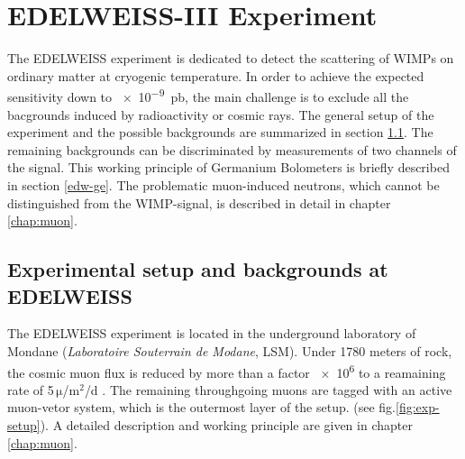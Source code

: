 
\section{EDELWEISS-III Experiment}
  \label{edw}
  The EDELWEISS experiment is dedicated to detect the scattering of WIMPs on ordinary matter at cryogenic temperature. In order to achieve the expected sensitivity down to \SI{e-9}{pb}, the main challenge is to exclude all the bacgrounds induced by radioactivity or cosmic rays. The general setup of the experiment and the possible backgrounds are summarized in section \ref{sec:edw-exp}. The remaining backgrounds can be discriminated by measurements of two channels of the signal. This working principle of Germanium Bolometers is briefly described in section \ref{edw-ge}.
  The problematic muon-induced neutrons, which cannot be distinguished from the WIMP-signal, is described in detail in chapter \ref{chap:muon}.
\subsection{Experimental setup and backgrounds at EDELWEISS}
  \label{sec:edw-exp}
  The EDELWEISS experiment is located in the underground laboratory of Mondane (\textit{Laboratoire Souterrain de Modane}, LSM). Under 1780 meters of rock, the cosmic muon flux is reduced by more than a factor \num{e6} to a reamaining rate of 5\,$\mathrm{\mu}$/$\mathrm{m}^{2}$/d \cite{Sch13a}.
  The remaining throughgoing muons are tagged with an active muon-vetor system, which is the outermost layer of the setup. (see fig.\ref{fig:exp-setup}). A detailed description and working principle are given in chapter \ref{chap:muon}.

